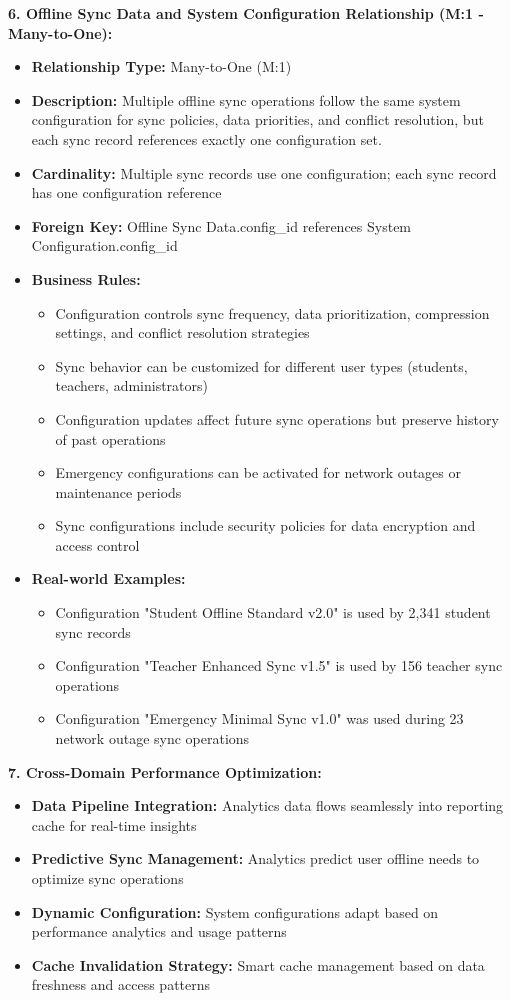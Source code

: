 \documentclass[12pt,a4paper,oneside]{book}
\begin{document}
\textbf{6. Offline Sync Data and System Configuration Relationship (M:1 - Many-to-One):}
\begin{itemize}
    \item \textbf{Relationship Type:} Many-to-One (M:1)
    \item \textbf{Description:} Multiple offline sync operations follow the same system configuration for sync policies, data priorities, and conflict resolution, but each sync record references exactly one configuration set.
    \item \textbf{Cardinality:} Multiple sync records use one configuration; each sync record has one configuration reference
    \item \textbf{Foreign Key:} Offline Sync Data.config\_id references System Configuration.config\_id
    \item \textbf{Business Rules:}
        \begin{itemize}
            \item Configuration controls sync frequency, data prioritization, compression settings, and conflict resolution strategies
            \item Sync behavior can be customized for different user types (students, teachers, administrators)
            \item Configuration updates affect future sync operations but preserve history of past operations
            \item Emergency configurations can be activated for network outages or maintenance periods
            \item Sync configurations include security policies for data encryption and access control
        \end{itemize}
    \item \textbf{Real-world Examples:}
        \begin{itemize}
            \item Configuration "Student Offline Standard v2.0" is used by 2,341 student sync records
            \item Configuration "Teacher Enhanced Sync v1.5" is used by 156 teacher sync operations
            \item Configuration "Emergency Minimal Sync v1.0" was used during 23 network outage sync operations
        \end{itemize}
\end{itemize}

\textbf{7. Cross-Domain Performance Optimization:}
\begin{itemize}
    \item \textbf{Data Pipeline Integration:} Analytics data flows seamlessly into reporting cache for real-time insights
    \item \textbf{Predictive Sync Management:} Analytics predict user offline needs to optimize sync operations
    \item \textbf{Dynamic Configuration:} System configurations adapt based on performance analytics and usage patterns
    \item \textbf{Cache Invalidation Strategy:} Smart cache management based on data freshness and access patterns
\end{itemize}
\end{document}
